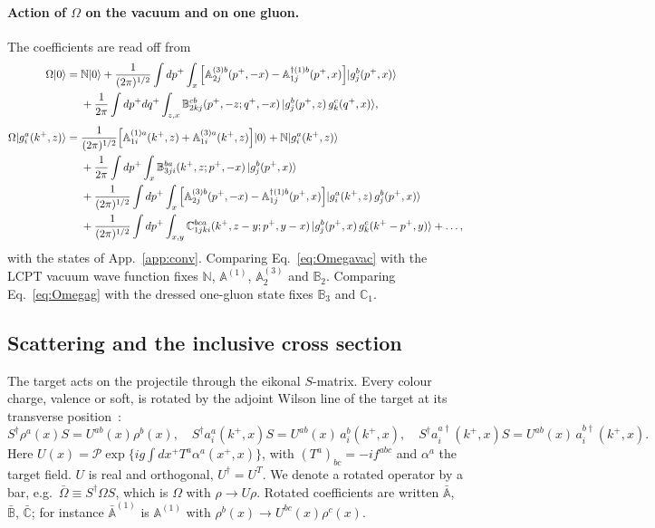 \documentclass[aps,prd,onecolumn,superscriptaddress,nofootinbib,floatfix,longbibliography,11pt]{revtex4-2}
\numberwithin{equation}{section}
\def\mf#1{\mathbb{#1}}
\begin{document}
\paragraph*{Action of $\Omega$ on the vacuum and on one gluon.} The coefficients are read off from
\begin{align}
\Omega|0\rangle={}&\mf N|0\rangle+\frac{1}{(2\pi)^{1/2}}\int dp^+\int_x\Big[\mf A^{(3)b}_{2j}(p^+,-x)-\mf A^{\dagger(1)b}_{1j}(p^+,x)\Big]|g^b_j(p^+,x)\rangle\notag\\
&+\frac{1}{2\pi}\int dp^+dq^+\int_{z,x}\mf B^{cb}_{2kj}(p^+,-z;q^+,-x)\,|g^b_j(p^+,z)\,g^c_k(q^+,x)\rangle,\label{eq:Omegavac}\\[3pt]
\Omega|g^a_i(k^+,z)\rangle={}&\frac{1}{(2\pi)^{1/2}}\Big[\mf A^{(1)a}_{1i}(k^+,z)+\mf A^{(3)a}_{1i}(k^+,z)\Big]|0\rangle+\mf N|g^a_i(k^+,z)\rangle\notag\\
&+\frac{1}{2\pi}\int dp^+\int_x\mf B^{ba}_{3ji}(k^+,z;p^+,-x)\,|g^b_j(p^+,x)\rangle\notag\\
&+\frac{1}{(2\pi)^{1/2}}\int dp^+\int_x\Big[\mf A^{(3)b}_{2j}(p^+,-x)-\mf A^{\dagger(1)b}_{1j}(p^+,x)\Big]|g^a_i(k^+,z)\,g^b_j(p^+,x)\rangle\notag\\
&+\frac{1}{(2\pi)^{1/2}}\int dp^+\int_{x,y}\mf C^{bca}_{1jki}(k^+,z-y;p^+,y-x)\,|g^b_j(p^+,x)\,g^c_k(k^+-p^+,y)\rangle+\dots,\label{eq:Omegag}
\end{align}
with the states of App.~\ref{app:conv}. Comparing Eq.~\eqref{eq:Omegavac} with the LCPT vacuum wave function fixes $\mf N$, $\mf A^{(1)}$, $\mf A^{(3)}_2$ and $\mf B_2$. Comparing Eq.~\eqref{eq:Omegag} with the dressed one-gluon state fixes $\mf B_3$ and $\mf C_1$.

\subsection{Scattering and the inclusive cross section}\label{sec:xsecdef}

The target acts on the projectile through the eikonal $S$-matrix. Every colour charge, valence or soft, is rotated by the adjoint Wilson line of the target at its transverse position~\cite{Kovner:2005nq}:
\begin{equation}
S^\dagger\rho^a(x)S=U^{ab}(x)\rho^b(x),\quad S^\dagger a^a_i(k^+,x)S=U^{ab}(x)\,a^b_i(k^+,x),\quad S^\dagger a^{a\dagger}_i(k^+,x)S=U^{ab}(x)\,a^{b\dagger}_i(k^+,x).
\label{eq:Srot}
\end{equation}
Here $U(x)=\mathcal P\exp\{ig\int dx^+T^a\alpha^a(x^+,x)\}$, with $(T^a)_{bc}=-if^{abc}$ and $\alpha^a$ the target field. $U$ is real and orthogonal, $U^\dagger=U^T$. We denote a rotated operator by a bar, e.g.\ $\bar\Omega\equiv S^\dagger\Omega S$, which is $\Omega$ with $\rho\to U\rho$. Rotated coefficients are written $\bar{\mf A}$, $\bar{\mf B}$, $\bar{\mf C}$; for instance $\bar{\mf A}^{(1)}$ is $\mf A^{(1)}$ with $\rho^b(x)\to U^{bc}(x)\rho^c(x)$.
\end{document}
